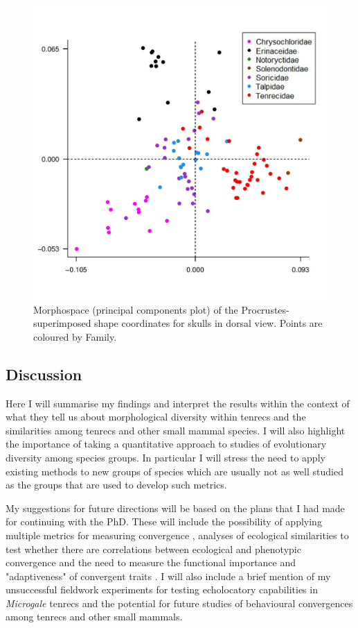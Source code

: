 \documentclass[12pt,a4paper]{article}
\begin{document}
  \begin{figure}[!htb]
	\centering
	\includegraphics[width=\textwidth, height=\textheight, keepaspectratio=true]{skdors_allfam_PCA_legend.png}
		\caption{Morphospace (principal components plot) of the 		Procrustes-superimposed shape coordinates for skulls in dorsal view. Points are coloured by Family.}
	\label{fig:skdors_pca}
  \end{figure}

	

\subsection{Discussion}

	Here I will summarise my findings and interpret the results within the context of what they tell us about morphological diversity within tenrecs and the similarities among tenrecs and other small mammal species. I will also highlight the importance of taking a quantitative approach to studies of evolutionary diversity among species groups. In particular I will stress the need to apply existing methods to new groups of species which are usually not as well studied as the groups that are used to develop such metrics. %

	My suggestions for future directions will be based on the plans that I had made for continuing with the PhD. These will include the possibility of applying multiple metrics for measuring convergence \citep[e.g.][]{Ingram2013, Segar2013, Harmon2005}, analyses of ecological similarities to test whether there are correlations between ecological and phenotypic convergence \citep[e.g.][]{Moen2013} and the need to measure the functional importance and "adaptiveness" of convergent traits \citep{Losos2010}. I will also include a brief mention of my unsuccessful fieldwork experiments for testing echolocatory capabilities in \textit{Microgale} tenrecs and the potential for future studies of behavioural convergences among tenrecs and other small mammals.
\end{document}
